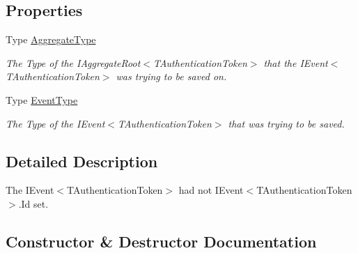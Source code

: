 \subsection*{Properties}
\begin{DoxyCompactItemize}
\item 
Type \hyperlink{classCqrs_1_1Domain_1_1Exceptions_1_1AggregateOrEventMissingIdException_a05dd2bfa86d067aca316a7d880dc3c18_a05dd2bfa86d067aca316a7d880dc3c18}{Aggregate\+Type}
\begin{DoxyCompactList}\small\item\em The Type of the I\+Aggregate\+Root$<$\+T\+Authentication\+Token$>$ that the I\+Event$<$\+T\+Authentication\+Token$>$ was trying to be saved on. \end{DoxyCompactList}\item 
Type \hyperlink{classCqrs_1_1Domain_1_1Exceptions_1_1AggregateOrEventMissingIdException_ac9f60e1491680ab596b0501b669a4e1c_ac9f60e1491680ab596b0501b669a4e1c}{Event\+Type}
\begin{DoxyCompactList}\small\item\em The Type of the I\+Event$<$\+T\+Authentication\+Token$>$ that was trying to be saved. \end{DoxyCompactList}\end{DoxyCompactItemize}


\subsection{Detailed Description}
The I\+Event$<$\+T\+Authentication\+Token$>$ had not I\+Event$<$\+T\+Authentication\+Token$>$.\+Id set. 



\subsection{Constructor \& Destructor Documentation}
\mbox{\label{classCqrs_1_1Domain_1_1Exceptions_1_1AggregateOrEventMissingIdException_ac63e413557df17ed490a8b787e17d960_ac63e413557df17ed490a8b787e17d960}} 
